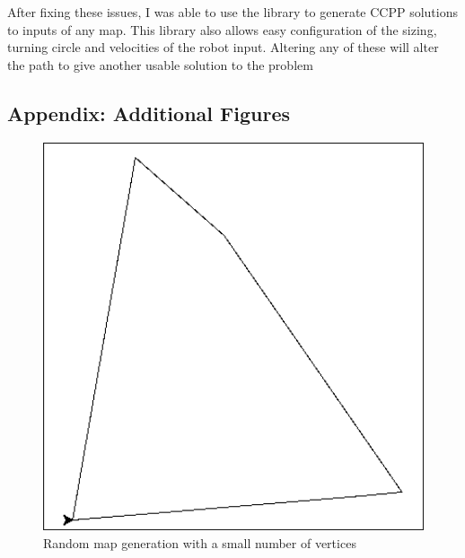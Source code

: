 \documentclass[progress]{cmpreport}
\begin{document}
After fixing these issues, I was able to use the library to generate CCPP solutions to inputs of any map.
This library also allows easy configuration of the sizing, turning circle and velocities of the robot input.
Altering any of these will alter the path to give another usable solution to the problem




\begin{appendix}
	\section{Appendix: Additional Figures}

	\begin{figure}[ht]
		\begin{minipage}[b]{0.45\textwidth} %
			\includegraphics[width=1\textwidth]{FirstMappingSmall.jpg}
			\caption{Random map generation with a small number of vertices}
			\label{fig:image1}
		\end{minipage}


\end{figure}
\end{appendix}
\end{document}
